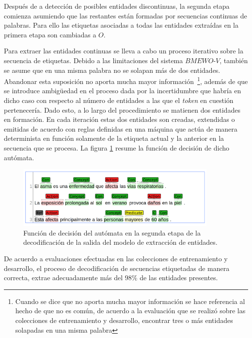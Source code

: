 Después de a detección de posibles entidades discontinuas, la segunda etapa comienza asumiendo que las restantes están formadas por secuencias continuas de palabras.
Para ello las etiquetas asociadas a todas las entidades extraídas en la primera etapa son cambiadas a $O$. 


Para extraer las entidades continuas se lleva a cabo un proceso iterativo sobre la secuencia de etiquetas.
Debido a las limitaciones del sistema $BMEWO$-$V$, también se asume que en una misma palabra no se solapan más de dos entidades.
Abandonar esta suposición no aporta mucha mayor información~\footnote{Cuando se dice que no aporta mucha mayor información se hace referencia al hecho de que no es común, de acuerdo a la evaluación que se realizó sobre las colecciones de entrenamiento y desarrollo, encontrar tres o más entidades solapadas en una misma palabra}, además de que se introduce ambigüedad en el proceso dada por la incertidumbre que habría en dicho caso con respecto al número de entidades a las que el \textit{token} en cuestión pertenecería.
Dado esto, a lo largo del procedimiento se matienen dos entidades en formación.
En cada iteración estas dos entidades son creadas, extendidas o emitidas de acuerdo con reglas definidas en una máquina que actúa de manera determinista en función solamente de la etiqueta actual y la anterior en la secuencia que se procesa.
La figura \ref{fig:automaton} resume la función de decisión de dicho autómata. 

\begin{figure}[h!]
	\centering
	\includegraphics[width = 10cm]{Graphics/automaton.png}
	\caption{Función de decisión del autómata en la segunda etapa de la decodificación de la salida del modelo de extracción de entidades.}\label{fig:automaton}
\end{figure}

De acuerdo a evaluaciones efectuadas en las colecciones de entrenamiento y desarrollo, el proceso de decodificación de secuencias etiquetadas de manera correcta, extrae adecuadamente más del $98\%$ de las entidades presentes.


